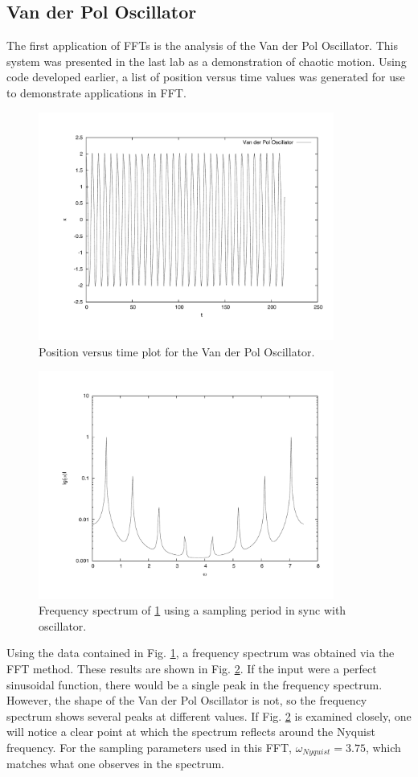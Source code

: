 \documentclass[12pt]{article}
\begin{document}
\subsection{Van der Pol Oscillator}
The first application of FFTs is the analysis of the Van der Pol Oscillator.  This system was presented in the last lab as a demonstration of chaotic motion.  Using code developed earlier, a list of position versus time values was generated for use to demonstrate applications in FFT.
\begin{figure}[!h]
\centering
\includegraphics[width =120 mm, height = 75mm]{van.pdf}
\caption{Position versus time plot for the Van der Pol Oscillator.}
\label{fig:van}
\end{figure}
\begin{figure}[!h]
\centering
\includegraphics[width =120 mm, height = 75mm]{Fig_6_18.pdf}
\caption{Frequency spectrum of \ref{fig:van} using a sampling period in sync with oscillator.}
\label{fig:618}
\end{figure}

Using the data contained in Fig. \ref{fig:van}, a frequency spectrum was obtained via the FFT method.  These results are shown in Fig. \ref{fig:618}.  If the input were a perfect sinusoidal function, there would be a single peak in the frequency spectrum.  However, the shape of the Van der Pol Oscillator is not, so the frequency spectrum shows several peaks at different values.  If Fig. \ref{fig:618} is examined closely, one will notice a clear point at which the spectrum reflects around the Nyquist frequency.  For the sampling parameters used in this FFT, $\omega_{Nyquist} = 3.75$, which matches what one observes in the spectrum.
\end{document}
